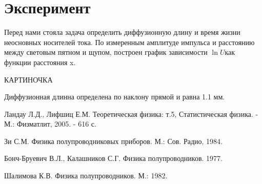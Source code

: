 \documentclass[a4paper,12pt]{article}
\begin{document}



\section{Эксперимент}
Перед нами стояла задача определить диффузионную длину и время жизни неосновных носителей тока. По измеренным амплитуде импульса и расстоянию между световым пятном и щупом, построен график зависимости $\ln{U}$как функции расстояния x.

КАРТИНОЧКА

Диффузионная длинна определена по наклону прямой и равна 1.1 мм. 


\begin{thebibliography}{99}
 Ландау Л.Д., Лифшиц Е.М. Теоретическая физика: т.5, Статистическая физика. - М.: Физматлит, 2005. - 616 с.

 Зи С.М. Физика полупроводниковых приборов. М.: Сов. Радио, 1984.

   Бонч-Бруевич В.Л., Калашников С.Г. Физика полупроводников. 1977.

    Шалимова К.В. Физика полупроводников. М.: 1982.
\end{thebibliography}
\end{document}
